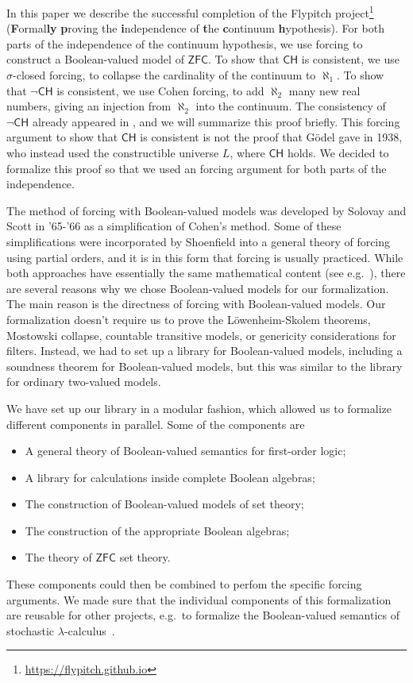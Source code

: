 \documentclass[sigplan,10pt,review, autoref,anonymous]{acmart}
\theoremstyle{definition}
\begin{document}
In this paper we describe the successful completion of the Flypitch project\footnote{\url{https://flypitch.github.io}} (\textbf{F}ormal\textbf{ly} \textbf{p}roving the \textbf{i}ndependence of \textbf{t}he \textbf{c}ontinuum \textbf{h}ypothesis).
For both parts of the independence of the continuum hypothesis, we use forcing to construct a Boolean-valued model of $\mathsf{ZFC}$.
To show that $\mathsf{CH}$ is consistent, we use $\sigma$-closed forcing, to collapse the cardinality of the continuum to $\aleph_1$.
To show that $\neg \mathsf{CH}$ is consistent, we use Cohen forcing, to add $\aleph_2$ many new real numbers, giving an injection from $\aleph_2$ into the continuum.
The consistency of $\neg \mathsf{CH}$ already appeared in \cite{DBLP:conf/itp/HanD19}, and we will summarize this proof briefly.
This forcing argument to show that $\mathsf{CH}$ is consistent is not the proof that G\"odel gave in 1938, who instead used the constructible universe $L$, where $\mathsf{CH}$ holds. We decided to formalize this proof so that we used an forcing argument for both parts of the independence.

The method of forcing with Boolean-valued models was developed by Solovay and Scott in '65-'66 \cite{scott1967proof,scott-solovay} as a simplification of Cohen's method.
Some of these simplifications were incorporated by Shoenfield \cite{shoenfield1971unramified} into a general theory of forcing using partial orders, and it is in this form that forcing is usually practiced.
While both approaches have essentially the same mathematical content (see e.g.\ \cite{kunen2014set, jech2013set, moore2019method}), there are several reasons why we chose Boolean-valued models for our formalization.
The main reason is the directness of forcing with Boolean-valued models.
Our formalization doesn't require us to prove the L\"owenheim-Skolem theorems, Mostowski collapse, countable transitive models, or genericity considerations for filters.
Instead, we had to set up a library for Boolean-valued models, including a soundness theorem for Boolean-valued models, but this was similar to the library for ordinary two-valued models.

We have set up our library in a modular fashion, which allowed us to formalize different components in parallel. Some of the components are
\begin{itemize}
  \item A general theory of Boolean-valued semantics for first-order logic;
  \item A library for calculations inside complete Boolean algebras;
  \item The construction of Boolean-valued models of set theory;
  \item The construction of the appropriate Boolean algebras;
  \item The theory of \(\mathsf{ZFC}\) set theory.
\end{itemize}
These components could then be combined to perfom the specific forcing arguments.
We made sure that the individual components of this formalization are reusable for other projects, e.g.\ to formalize the Boolean-valued semantics of stochastic $\lambda$-calculus~\cite{scott2014stochastic, bacci2018boolean}.
\end{document}
